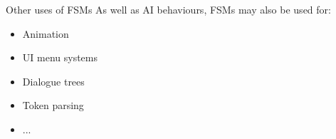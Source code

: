 


\begin{frame}{Other uses of FSMs}
    As well as AI behaviours, FSMs may also be used for: \pause
    \begin{itemize}
        \item Animation \pause
        \item UI menu systems \pause
        \item Dialogue trees \pause
        \item Token parsing \pause
        \item ...
    \end{itemize}
\end{frame}

